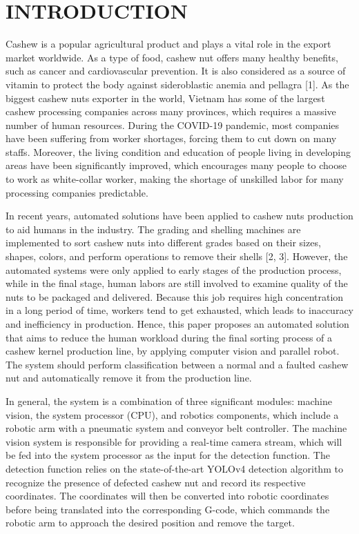 \documentclass[10pt, letterpaper]{article}
\begin{document}
\section{INTRODUCTION}
    Cashew is a popular agricultural product and plays a vital role in the export market worldwide. As a type of food, cashew nut offers many healthy benefits, such as cancer and cardiovascular prevention. It is also considered as a source of vitamin to protect the body against sideroblastic anemia and pellagra [1]. As the biggest cashew nuts exporter in the world, Vietnam has some of the largest cashew processing companies across many provinces, which requires a massive number of human resources. During the COVID-19 pandemic, most companies have been suffering from worker shortages, forcing them to cut down on many staffs. Moreover, the living condition and education of people living in developing areas have been significantly improved, which encourages many people to choose to work as white-collar worker, making the shortage of unskilled labor for many processing companies predictable.\par
    In recent years, automated solutions have been applied to cashew nuts production to aid humans in the industry. The grading and shelling machines are implemented to sort cashew nuts into different grades based on their sizes, shapes, colors, and perform operations to remove their shells [2, 3]. However, the automated systems were only applied to early stages of the production process, while in the final stage, human labors are still involved to examine quality of the nuts to be packaged and delivered. Because this job requires high concentration in a long period of time, workers tend to get exhausted, which leads to inaccuracy and inefficiency in production. Hence, this paper proposes an automated solution that aims to reduce the human workload during the final sorting process of a cashew kernel production line, by applying computer vision and parallel robot. The system should perform classification between a normal and a faulted cashew nut and automatically remove it from the production line.\par
    In general, the system is a combination of three significant modules: machine vision, the system processor (CPU), and robotics components, which include a robotic arm with a pneumatic system and conveyor belt controller. The machine vision system is responsible for providing a real-time camera stream, which will be fed into the system processor as the input for the detection function. The detection function relies on the state-of-the-art YOLOv4 detection algorithm to recognize the presence of defected cashew nut and record its respective coordinates. The coordinates will then be converted into robotic coordinates before being translated into the corresponding G-code, which commands the robotic arm to approach the desired position and remove the target.\par
\end{document}
